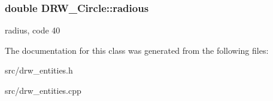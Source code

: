 \subsubsection[{radious}]{\setlength{\rightskip}{0pt plus 5cm}double D\+R\+W\+\_\+\+Circle\+::radious}\label{class_d_r_w___circle_ab431594544fbe949dd44cbb79e1a7237}
radius, code 40 

The documentation for this class was generated from the following files\+:\begin{DoxyCompactItemize}
\item 
src/drw\+\_\+entities.\+h\item 
src/drw\+\_\+entities.\+cpp\end{DoxyCompactItemize}
